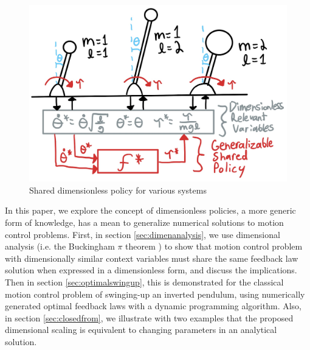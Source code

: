 \begin{figure}[t]
\begin{center}
\includegraphics[width=0.99\linewidth]{fig/big_picture3.jpg}
\caption{Shared dimensionless policy for various systems}\label{fig:big_picture}
\end{center}
\vspace{-10pt}
\end{figure}

In this paper, we explore the concept of dimensionless policies, a more generic form of knowledge, has a mean to generalize numerical solutions to motion control problems. First, in section \ref{sec:dimenanalysis}, we use dimensional analysis (i.e. the Buckingham $\pi$ theorem \cite{buckingham_physically_1914}) to show that motion control problem with dimensionally similar context variables must share the same feedback law solution when expressed in a dimensionless form, and discuss the implications. Then in section \ref{sec:optimalswingup}, this is demonstrated for the classical motion control problem of swinging-up an inverted pendulum, using numerically generated optimal feedback laws with a dynamic programming algorithm. Also, in section \ref{sec:closedfrom}, we illustrate with two examples that the proposed dimensional scaling is equivalent to changing parameters in an analytical solution. 

